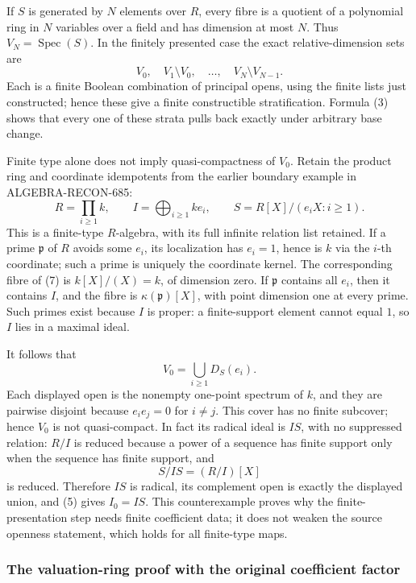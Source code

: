 If \(S\) is generated by \(N\) elements over \(R\), every fibre is a quotient of a polynomial ring in \(N\) variables over a field and has dimension at most \(N\). Thus \(V_N=\operatorname{Spec}(S)\). In the finitely presented case the exact relative-dimension sets are \[
 V_0,\quad V_1\setminus V_0,\quad\ldots,\quad V_N\setminus V_{N-1}.
\] Each is a finite Boolean combination of principal opens, using the finite lists just constructed; hence these give a finite constructible stratification. Formula (3) shows that every one of these strata pulls back exactly under arbitrary base change.

Finite type alone does not imply quasi-compactness of \(V_0\). Retain the product ring and coordinate idempotents from the earlier boundary example in ALGEBRA-\AlgebraIdentifierBreak{}RECON-\AlgebraIdentifierBreak{}685: \[
 R=\prod_{i\geq1}k,\qquad
 I=\bigoplus_{i\geq1}k e_i,\qquad
 S=R[X]/(e_iX:i\geq1).
 \tag{7}
\] This is a finite-type \(R\)-algebra, with its full infinite relation list retained. If a prime \(\mathfrak p\) of \(R\) avoids some \(e_i\), its localization has \(e_i=1\), hence is \(k\) via the \(i\)-th coordinate; such a prime is uniquely the coordinate kernel. The corresponding fibre of (7) is \(k[X]/(X)=k\), of dimension zero. If \(\mathfrak p\) contains all \(e_i\), then it contains \(I\), and the fibre is \(\kappa(\mathfrak p)[X]\), with point dimension one at every prime. Such primes exist because \(I\) is proper: a finite-support element cannot equal \(1\), so \(I\) lies in a maximal ideal.

It follows that \[
 V_0=\bigcup_{i\geq1}D_S(e_i).
\] Each displayed open is the nonempty one-point spectrum of \(k\), and they are pairwise disjoint because \(e_ie_j=0\) for \(i\ne j\). This cover has no finite subcover; hence \(V_0\) is not quasi-compact. In fact its radical ideal is \(IS\), with no suppressed relation: \(R/I\) is reduced because a power of a sequence has finite support only when the sequence has finite support, and \[
 S/IS=(R/I)[X]
\] is reduced. Therefore \(IS\) is radical, its complement open is exactly the displayed union, and (5) gives \(I_0=IS\). This counterexample proves why the finite-presentation step needs finite coefficient data; it does not weaken the source openness statement, which holds for all finite-type maps.

\subsubsection{The valuation-ring proof with the original coefficient factor}\label{algebra-proof-034-the-valuation-ring-proof-with-the-original-coefficient-factor}

